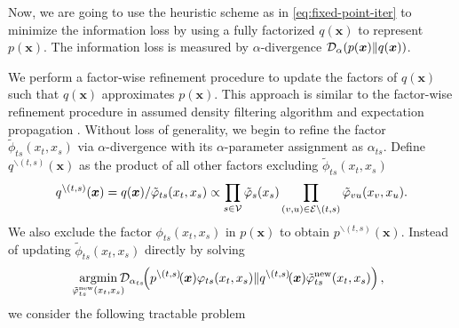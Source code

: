 Now, we are going to use the heuristic scheme as in \eqref{eq:fixed-point-iter} to minimize the information loss by using a fully factorized $q(\bm{x})$ to represent $p(\bm{x})$. The information loss is measured by $\alpha$-divergence $\mathcal{D}_{\alpha}(p(\bm{x}) \| q(\bm{x}))$.


We perform a factor-wise refinement procedure to update the factors of $q(\bm{x})$ such that $q(\bm{x})$ approximates $p(\bm{x})$. This approach is similar to the factor-wise refinement procedure in assumed density filtering algorithm\cite{ghosh2016assumed, opper1999bayesian} and expectation propagation \cite{divergence-measures-and-message-passing,Minka:2001:EPA:647235.720257}. Without loss of generality, we begin to refine the factor $\tilde{\phi}_{ts}(x_t, x_s)$ via $\alpha$-divergence with its $\alpha$-parameter assignment as $\alpha_{ts}$. Define $q^{\backslash (t,s)}(\bm{x})$ as the product of all other factors excluding $\tilde{\phi}_{ts}(x_t, x_s)$
\begin{align}
  q^{\backslash (t,s)}(\bm{x})
  = q(\bm{x})/\tilde{\varphi}_{ts}(x_t,
  x_s) \propto \prod_{{s\in \mathcal{V}}} \tilde{\varphi}_s(x_s) \prod_{(v,u) \in
  \mathcal{E}\backslash (t,s)}
  \tilde{\varphi}_{vu}(x_v, x_u).
\end{align}
We also exclude the factor $\phi_{ts}(x_t, x_s)$ in $p(\bm{x})$ to obtain $p^{\backslash (t,s)}(\bm{x})$. %
Instead of updating $\tilde{\phi}_{ts}(x_t, x_s)$ directly by solving
\begin{equation}
  \!\!\!\uargmin{\tilde{\phi}_{ts}^{\mathrm{new}}(x_t, x_s)}\!\!\!\! \Dd_{\alpha_{ts}}\!\!\left(  p^{\backslash (t,s)}\!(\bm{x})\phi_{ts}(x_t, x_s)\|q^{\backslash (t,s)}\!(\bm{x})\tilde{\phi}_{ts}^{\mathrm{new}}(x_t, x_s)\right),
\end{equation}
we consider the following tractable problem
